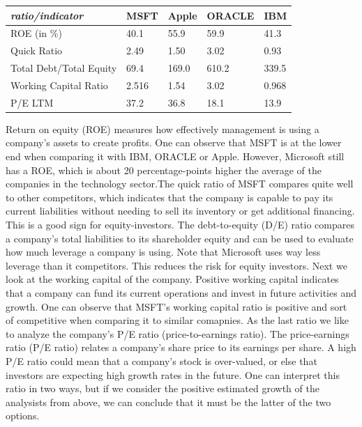 \documentclass[]{article}
\begin{document}
	\begin{table}[h]
		\begin{tabular}{|l|l|l|l|l|}
			\hline
			\textit{\textbf{ratio/indicator}} & \textbf{MSFT} & \textbf{Apple} & \textbf{ORACLE} & \textbf{IBM} \\ \hline
			ROE (in \%) & 40.1 & 55.9 & 59.9 & 41.3 \\ \hline
			Quick Ratio & 2.49 & 1.50 & 3.02 & 0.93 \\ \hline
			Total Debt/Total Equity & 69.4 & 169.0 & 610.2 & 339.5 \\ \hline
			Working Capital Ratio & 2.516 & 1.54 & 3.02 & 0.968 \\ \hline
			P/E LTM & 37.2 & 36.8 & 18.1 & 13.9 \\ \hline
		\end{tabular}
	\end{table}
	\noindent Return on equity (ROE) measures how effectively management is using a company’s assets to create profits. One can observe that MSFT is at the lower end when comparing it with IBM, ORACLE or Apple. However, Microsoft still has a ROE, which is about 20 percentage-points higher the average of the companies in the technology sector.The quick ratio of MSFT compares quite well to other competitors, which indicates that the company is capable to pay its current liabilities without needing to sell its inventory or get additional financing. This is a good sign for equity-investors. The debt-to-equity (D/E) ratio compares a company’s total liabilities to its shareholder equity and can be used to evaluate how much leverage a company is using. Note that Microsoft uses way less leverage than it competitors. This reduces the risk for equity investors. Next we look at the working capital of the company. Positive working capital indicates that a company can fund its current operations and invest in future activities and growth. One can observe that MSFT's working capital ratio is positive and sort of competitive when comparing it to similar comapnies. As the last ratio we like to analyze the company's P/E ratio (price-to-earnings ratio). The price-earnings ratio (P/E ratio) relates a company's share price to its earnings per share. A high P/E ratio could mean that a company's stock is over-valued, or else that investors are expecting high growth rates in the future. One can interpret this ratio in two ways, but if we consider the positive estimated growth of the analysists from above, we can conclude that it must be the latter of the two options.
	
\end{document}
